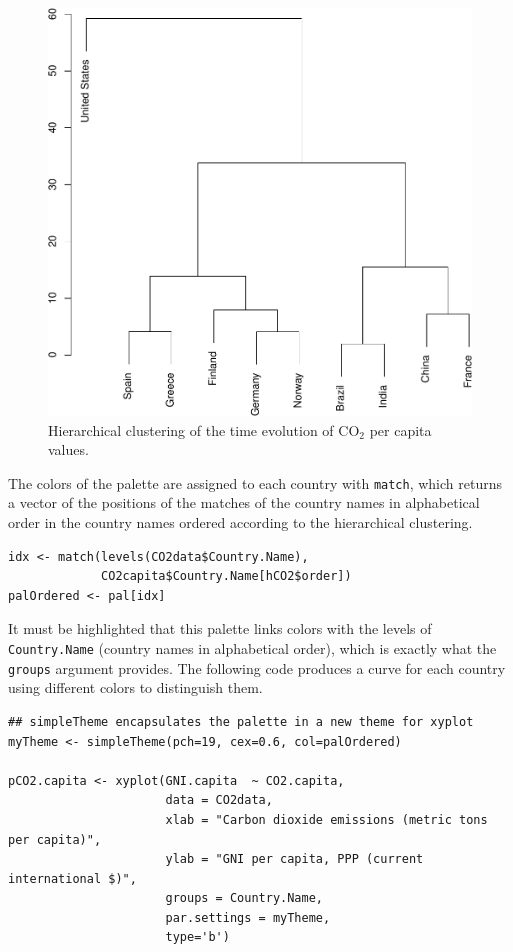\begin{figure}[htbp]
\centering
\includegraphics[width=.9\linewidth]{figs/hclust.pdf}
\caption{Hierarchical clustering of the time evolution of \(\mathrm{CO_2}\) per capita values. \label{fig:hclustCO2}}
\end{figure}


The colors of the palette are assigned to each country with \texttt{match},
which returns a vector of the positions of the matches of the country
names in alphabetical order in the country names ordered according to
the hierarchical clustering.
\lstset{language=r,label= ,caption= ,captionpos=b,numbers=none}
\begin{lstlisting}
idx <- match(levels(CO2data$Country.Name), 
             CO2capita$Country.Name[hCO2$order])
palOrdered <- pal[idx]  
\end{lstlisting}
It must be highlighted that this palette links colors with the levels
of \texttt{Country.Name} (country names in alphabetical order), which is
exactly what the \texttt{groups} argument provides. The following code
produces a curve for each country using different colors to
distinguish them.

\lstset{language=r,label= ,caption= ,captionpos=b,numbers=none}
\begin{lstlisting}
## simpleTheme encapsulates the palette in a new theme for xyplot
myTheme <- simpleTheme(pch=19, cex=0.6, col=palOrdered)

pCO2.capita <- xyplot(GNI.capita  ~ CO2.capita,
                      data = CO2data,
                      xlab = "Carbon dioxide emissions (metric tons per capita)",
                      ylab = "GNI per capita, PPP (current international $)",
                      groups = Country.Name,
                      par.settings = myTheme,
                      type='b')
\end{lstlisting}

